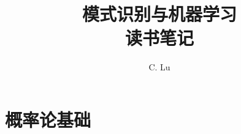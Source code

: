 \documentclass[11pt]{ctexbook}
\title{\textbf{模式识别与机器学习\\ 读书笔记} }
\author{C. Lu}
\begin{document}
\maketitle
\tableofcontents

\chapter{概率论基础}

\end{document}
